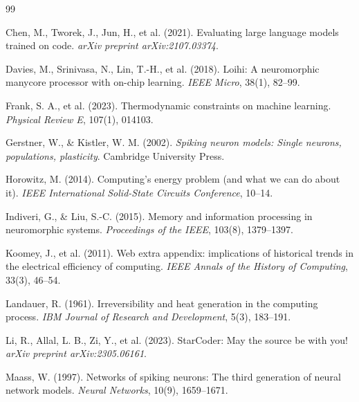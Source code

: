 \documentclass[11pt,a4paper]{article}
\begin{document}

\begin{thebibliography}{99}

Chen, M., Tworek, J., Jun, H., et al. (2021).
Evaluating large language models trained on code.
\textit{arXiv preprint arXiv:2107.03374}.

Davies, M., Srinivasa, N., Lin, T.-H., et al. (2018).
Loihi: A neuromorphic manycore processor with on-chip learning.
\textit{IEEE Micro}, 38(1), 82--99.

Frank, S. A., et al. (2023).
Thermodynamic constraints on machine learning.
\textit{Physical Review E}, 107(1), 014103.

Gerstner, W., \& Kistler, W. M. (2002).
\textit{Spiking neuron models: Single neurons, populations, plasticity}.
Cambridge University Press.

Horowitz, M. (2014).
Computing's energy problem (and what we can do about it).
\textit{IEEE International Solid-State Circuits Conference}, 10--14.

Indiveri, G., \& Liu, S.-C. (2015).
Memory and information processing in neuromorphic systems.
\textit{Proceedings of the IEEE}, 103(8), 1379--1397.

Koomey, J., et al. (2011).
Web extra appendix: implications of historical trends in the electrical efficiency of computing.
\textit{IEEE Annals of the History of Computing}, 33(3), 46--54.

Landauer, R. (1961).
Irreversibility and heat generation in the computing process.
\textit{IBM Journal of Research and Development}, 5(3), 183--191.

Li, R., Allal, L. B., Zi, Y., et al. (2023).
StarCoder: May the source be with you!
\textit{arXiv preprint arXiv:2305.06161}.

Maass, W. (1997).
Networks of spiking neurons: The third generation of neural network models.
\textit{Neural Networks}, 10(9), 1659--1671.


\end{thebibliography}
\end{document}
